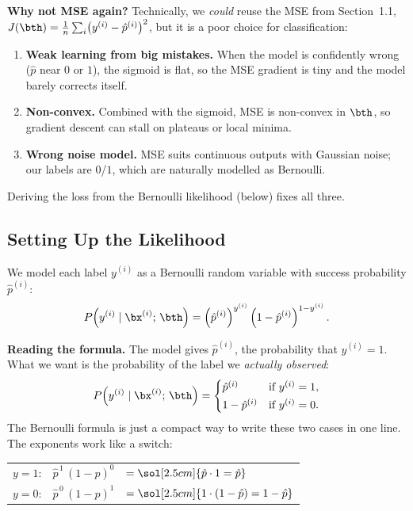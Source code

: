 \documentclass[12pt, a4paper]{article}
\begin{document}
\begin{notebox}
  \textbf{Why not MSE again?}
  Technically, we \emph{could} reuse the MSE from Section~1.1,
  $J(\bth) = \frac{1}{n}\sum_{i}\bigl(y^{(i)} - \hat{p}^{(i)}\bigr)^2$,
  but it is a poor choice for classification:
  \begin{enumerate}[nosep]
    \item \textbf{Weak learning from big mistakes.}
          When the model is confidently wrong ($\hat{p}$ near $0$ or $1$),
          the sigmoid is flat, so the MSE gradient is tiny and the model
          barely corrects itself.
    \item \textbf{Non-convex.}
          Combined with the sigmoid, MSE is non-convex in $\bth$, so gradient
          descent can stall on plateaus or local minima.
    \item \textbf{Wrong noise model.}
          MSE suits continuous outputs with Gaussian noise; our labels are
          $0$/$1$, which are naturally modelled as Bernoulli.
  \end{enumerate}
  Deriving the loss from the Bernoulli likelihood (below) fixes all three.
\end{notebox}

\subsection{Setting Up the Likelihood}

We model each label $y^{(i)}$ as a Bernoulli random variable with success
probability $\hat{p}^{(i)}$:
\[
  P\!\left(y^{(i)} \mid \bx^{(i)};\,\bth\right)
  = \left(\hat{p}^{(i)}\right)^{y^{(i)}}
  \left(1 - \hat{p}^{(i)}\right)^{1 - y^{(i)}}.
\]

\textbf{Reading the formula.}
The model gives $\hat{p}^{(i)}$, the probability that $y^{(i)} = 1$.
What we want is the probability of the label we \emph{actually observed}:
\[
  P\!\left(y^{(i)} \mid \bx^{(i)};\,\bth\right) =
  \begin{cases}
    \hat{p}^{(i)}     & \text{if } y^{(i)} = 1, \\[2pt]
    1 - \hat{p}^{(i)} & \text{if } y^{(i)} = 0.
  \end{cases}
\]
The Bernoulli formula is just a compact way to write these two cases in one
line. The exponents work like a switch:

\begin{center}
  \renewcommand{\arraystretch}{1.4}
  \begin{tabular}{lll}
    $y = 1$: & $\hat{p}^{\,1}\,(1-\hat{p})^{0}$
             & $= \sol[2.5cm]{\hat{p} \cdot 1 = \hat{p}}$         \\
    $y = 0$: & $\hat{p}^{\,0}\,(1-\hat{p})^{1}$
             & $= \sol[2.5cm]{1 \cdot (1-\hat{p}) = 1 - \hat{p}}$
  \end{tabular}
\end{center}
\end{document}

